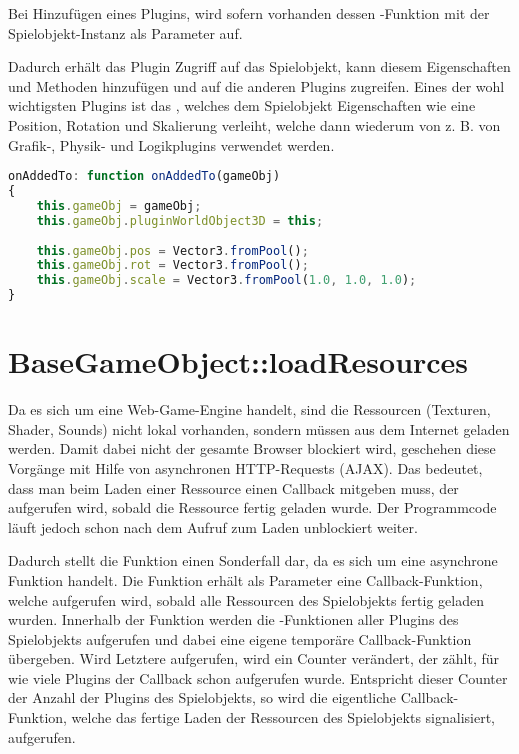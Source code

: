 Bei Hinzufügen eines Plugins, wird sofern vorhanden dessen -Funktion mit der Spielobjekt-Instanz als Parameter auf.

Dadurch erhält das Plugin Zugriff auf das Spielobjekt, kann diesem Eigenschaften und Methoden hinzufügen und auf die anderen Plugins zugreifen. Eines der wohl wichtigsten Plugins ist das , welches dem Spielobjekt Eigenschaften wie eine Position, Rotation und Skalierung verleiht, welche dann wiederum von z. B. von Grafik-, Physik- und Logikplugins verwendet werden.

\begin{lstlisting}[language=JavaScript]
onAddedTo: function onAddedTo(gameObj)
{
	this.gameObj = gameObj;
	this.gameObj.pluginWorldObject3D = this;
	
	this.gameObj.pos = Vector3.fromPool();
	this.gameObj.rot = Vector3.fromPool();
	this.gameObj.scale = Vector3.fromPool(1.0, 1.0, 1.0);
}
\end{lstlisting}

\section{BaseGameObject::loadResources}

Da es sich um eine Web-Game-Engine handelt, sind die Ressourcen (Texturen, Shader, Sounds) nicht lokal vorhanden, sondern müssen aus dem Internet geladen werden. Damit dabei nicht der gesamte Browser blockiert wird, geschehen diese Vorgänge mit Hilfe von asynchronen HTTP-Requests (AJAX). Das bedeutet, dass man beim Laden einer Ressource einen Callback mitgeben muss, der aufgerufen wird, sobald die Ressource fertig geladen wurde. Der Programmcode läuft jedoch schon nach dem Aufruf zum Laden unblockiert weiter.

Dadurch stellt die Funktion  einen Sonderfall dar, da es sich um eine asynchrone Funktion handelt. Die Funktion erhält als Parameter eine Callback-Funktion, welche aufgerufen wird, sobald alle Ressourcen des Spielobjekts fertig geladen wurden. Innerhalb der Funktion werden die -Funktionen aller Plugins des Spielobjekts aufgerufen und dabei eine eigene temporäre Callback-Funktion übergeben. Wird Letztere aufgerufen, wird ein Counter verändert, der zählt, für wie viele Plugins der Callback schon aufgerufen wurde. Entspricht dieser Counter der Anzahl der Plugins des Spielobjekts, so wird die eigentliche Callback-Funktion, welche das fertige Laden der Ressourcen des Spielobjekts signalisiert, aufgerufen.

